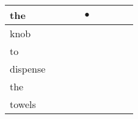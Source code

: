 \documentclass[landscape]{article}
\newcommand{\ssp}{\hspace{2pt}}
\newcommand{\mex}{\cellcolor{g}$\bullet$}
\begin{document}
\begin{tabular}{|l|p{10pt}|p{10pt}|p{10pt}|p{10pt}|p{10pt}|p{10pt}|p{10pt}|p{10pt}|}
\hline
\ssp \cellcolor{ref3}the \ssp&\hspace{2pt}&\hspace{2pt}&\hspace{2pt}&\hspace{2pt}\mex&\hspace{2pt}&\hspace{2pt}&\hspace{2pt}&\hspace{2pt}\\
\hline
\ssp knob \ssp&\hspace{2pt}&\hspace{2pt}&\hspace{2pt}&\hspace{2pt}&\hspace{2pt}&\hspace{2pt}&\hspace{2pt}&\hspace{2pt}\\
\hline
\ssp to \ssp&\hspace{2pt}&\hspace{2pt}&\hspace{2pt}&\hspace{2pt}&\hspace{2pt}&\hspace{2pt}&\hspace{2pt}&\hspace{2pt}\\
\hline
\ssp dispense \ssp&\hspace{2pt}&\hspace{2pt}&\hspace{2pt}&\hspace{2pt}&\hspace{2pt}&\hspace{2pt}&\hspace{2pt}&\hspace{2pt}\\
\hline
\ssp the \ssp&\hspace{2pt}&\hspace{2pt}&\hspace{2pt}&\hspace{2pt}&\hspace{2pt}&\hspace{2pt}&\hspace{2pt}&\hspace{2pt}\\
\hline
\ssp towels \ssp&\hspace{2pt}&\hspace{2pt}&\hspace{2pt}&\hspace{2pt}&\hspace{2pt}&\hspace{2pt}&\hspace{2pt}&\hspace{2pt}\\

\end{tabular}
\end{document}
